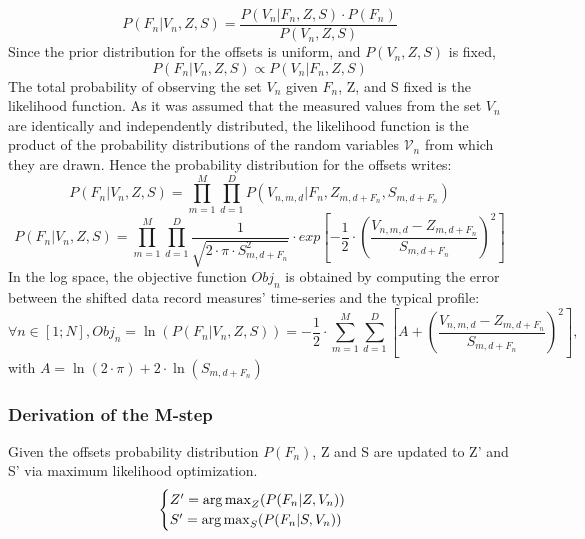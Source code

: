 \begin{equation}
    P(F_n|V_n,Z,S) = \frac{P(V_n|F_n,Z,S) \cdot P(F_n)}{P(V_n,Z,S)}
\end{equation}
Since the prior distribution for the offsets is uniform, and $P(V_n,Z,S)$ is fixed,
\begin{equation}
    P(F_n|V_n,Z,S) \propto P(V_n|F_n,Z,S)
\end{equation}
The total probability of observing the set $V_n$ given $F_n$, Z, and S fixed is the likelihood function. As it was assumed that the measured values from the set $V_n$ are identically and independently distributed, the likelihood function is the product of the  probability distributions of the random variables $\mathcal{V}_n$ from which they are drawn. Hence the probability distribution for the offsets writes:
\begin{equation}
    P(F_n|V_n,Z,S) = \prod_{m=1}^M \prod_{d=1}^D P(V_{n,m,d}|F_n,Z_{m,d+F_n},S_{m,d+F_n})
\end{equation}
\begin{equation}
    P(F_n|V_n,Z,S) = \prod_{m=1}^M \prod_{d=1}^D \frac{1}{ \sqrt{2\cdot\pi\cdot S_{m,d+F_n}^2} } \cdot exp \left[ -\frac{1}{2} \cdot \left(\frac{V_{n,m,d} - Z_{m,d+F_n}}{ S_{m,d+F_n} }\right)^2 \right]
\end{equation}
In the log space, the objective function $Obj_n$ is obtained by computing the error between the shifted data record measures' time-series and the typical profile:
\begin{equation}
    \forall n \in [1;N], Obj_n = \ln(P(F_n|V_n,Z,S)) = -\frac{1}{2} \cdot \sum_{m=1}^M \sum_{d=1}^D \left[ A + \left( \frac{V_{n,m,d} - Z_{m,d+F_n}}{ S_{m,d+F_n} } \right)^2 \right],
\end{equation} 
with $ A = \ln(2\cdot \pi) + 2\cdot \ln( S_{m,d+F_n} )$

\subsubsection{Derivation of the M-step}
Given the offsets probability distribution $P(F_n)$, Z and S are updated to Z' and S' via maximum likelihood optimization. 
\begin{equation}
    \begin{cases}
        Z' = \operatorname*{arg\,max}_Z(P(F_n|Z,V_n)) \\
        S' = \operatorname*{arg\,max}_S(P(F_n|S,V_n))\\
    \end{cases}
\end{equation}

